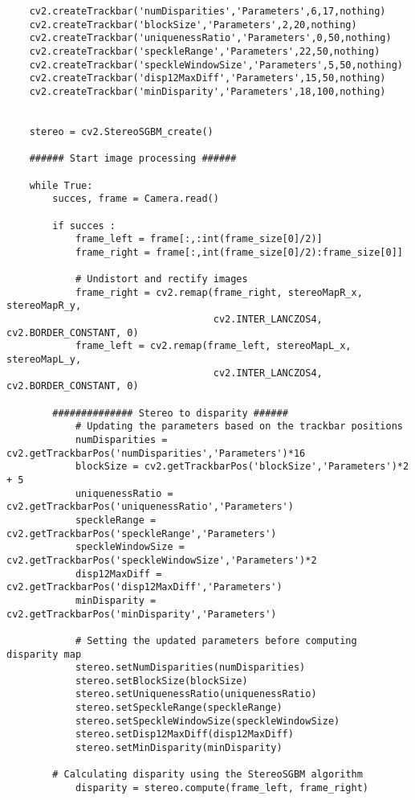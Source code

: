\begin{verbatim}
    cv2.createTrackbar('numDisparities','Parameters',6,17,nothing)
    cv2.createTrackbar('blockSize','Parameters',2,20,nothing)
    cv2.createTrackbar('uniquenessRatio','Parameters',0,50,nothing)
    cv2.createTrackbar('speckleRange','Parameters',22,50,nothing)
    cv2.createTrackbar('speckleWindowSize','Parameters',5,50,nothing)
    cv2.createTrackbar('disp12MaxDiff','Parameters',15,50,nothing)
    cv2.createTrackbar('minDisparity','Parameters',18,100,nothing)
    
    
    stereo = cv2.StereoSGBM_create()
    
    ###### Start image processing ######
    
    while True:
        succes, frame = Camera.read()
    
        if succes :
            frame_left = frame[:,:int(frame_size[0]/2)]
            frame_right = frame[:,int(frame_size[0]/2):frame_size[0]]
    
            # Undistort and rectify images
            frame_right = cv2.remap(frame_right, stereoMapR_x, stereoMapR_y,
                                    cv2.INTER_LANCZOS4, cv2.BORDER_CONSTANT, 0)
            frame_left = cv2.remap(frame_left, stereoMapL_x, stereoMapL_y, 
                                    cv2.INTER_LANCZOS4, cv2.BORDER_CONSTANT, 0)
    
        ############## Stereo to disparity ######
            # Updating the parameters based on the trackbar positions
            numDisparities = cv2.getTrackbarPos('numDisparities','Parameters')*16
            blockSize = cv2.getTrackbarPos('blockSize','Parameters')*2 + 5
            uniquenessRatio = cv2.getTrackbarPos('uniquenessRatio','Parameters')
            speckleRange = cv2.getTrackbarPos('speckleRange','Parameters')
            speckleWindowSize = cv2.getTrackbarPos('speckleWindowSize','Parameters')*2
            disp12MaxDiff = cv2.getTrackbarPos('disp12MaxDiff','Parameters')
            minDisparity = cv2.getTrackbarPos('minDisparity','Parameters')
            
            # Setting the updated parameters before computing disparity map
            stereo.setNumDisparities(numDisparities)
            stereo.setBlockSize(blockSize)
            stereo.setUniquenessRatio(uniquenessRatio)
            stereo.setSpeckleRange(speckleRange)
            stereo.setSpeckleWindowSize(speckleWindowSize)
            stereo.setDisp12MaxDiff(disp12MaxDiff)
            stereo.setMinDisparity(minDisparity)
    
    	# Calculating disparity using the StereoSGBM algorithm
            disparity = stereo.compute(frame_left, frame_right)


\end{verbatim}
